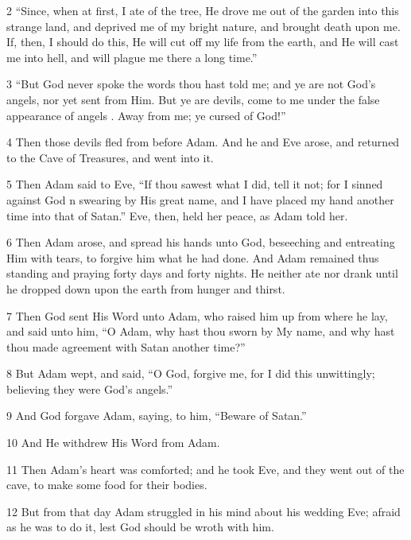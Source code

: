 \par 2 “Since, when at first, I ate of the tree, He drove me out of the garden into this strange land, and deprived me of my bright nature, and brought death upon me. If, then, I should do this, He will cut off my life from the earth, and He will cast me into hell, and will plague me there a long time.”

\par 3 “But God never spoke the words thou hast told me; and ye are not God's angels, nor yet sent from Him. But ye are devils, come to me under the false appearance of angels . Away from me; ye cursed of God!”

\par 4 Then those devils fled from before Adam. And he and Eve arose, and returned to the Cave of Treasures, and went into it.

\par 5 Then Adam said to Eve, “If thou sawest what I did, tell it not; for I sinned against God n swearing by His great name, and I have placed my hand another time into that of Satan.” Eve, then, held her peace, as Adam told her.

\par 6 Then Adam arose, and spread his hands unto God, beseeching and entreating Him with tears, to forgive him what he had done. And Adam remained thus standing and praying forty days and forty nights. He neither ate nor drank until he dropped down upon the earth from hunger and thirst.

\par 7 Then God sent His Word unto Adam, who raised him up from where he lay, and said unto him, “O Adam, why hast thou sworn by My name, and why hast thou made agreement with Satan another time?”

\par 8 But Adam wept, and said, “O God, forgive me, for I did this unwittingly; believing they were God's angels.”

\par 9 And God forgave Adam, saying, to him, “Beware of Satan.”

\par 10 And He withdrew His Word from Adam.

\par 11 Then Adam's heart was comforted; and he took Eve, and they went out of the cave, to make some food for their bodies.

\par 12 But from that day Adam struggled in his mind about his wedding Eve; afraid as he was to do it, lest God should be wroth with him.

